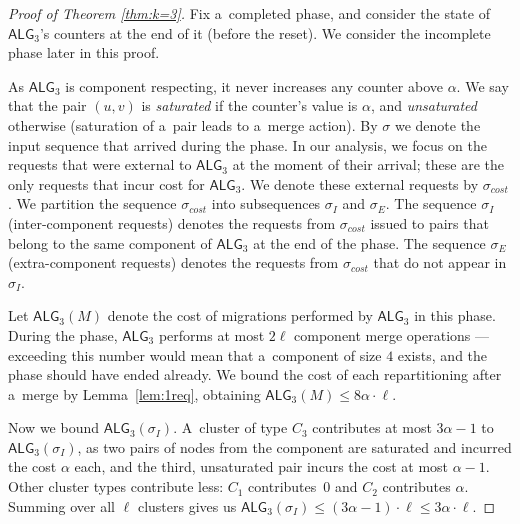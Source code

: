 \documentclass[a4paper,anonymous,USenglish]{lipics-v2019}
\newcommand{\TAlg}{{\ensuremath{\textsf{ALG}_{3}}}\xspace}
\begin{document}

\begin{proof}[Proof of Theorem \ref{thm:k=3}]
	Fix a~completed phase, and consider the state of \TAlg's counters at the end of it (before the reset).
	We consider the incomplete phase later in this proof.
	
	As \TAlg is component respecting, it never increases any counter above $\alpha$.
	We say that the pair $(u, v)$ is \emph{saturated} if the counter's value is $\alpha$, and \emph{unsaturated} otherwise (saturation of a~pair leads to a~merge action).
	By $\sigma$ we denote the input sequence that arrived during the phase.
	In our analysis, we focus on the requests that were external to \TAlg at the moment of their arrival; these are the only requests that incur cost for \TAlg.
	We denote these external requests by $\sigma_{cost}$.
	We partition the sequence $\sigma_{cost}$ into subsequences $\sigma_I$ and $\sigma_E$.
	The sequence $\sigma_I$ (inter-component requests) denotes the requests from $\sigma_{cost}$ issued to pairs that belong to the same component of \TAlg at the end of the phase.
	The sequence $\sigma_E$ (extra-component requests) denotes the requests from $\sigma_{cost}$ that do not appear in $\sigma_I$.
	
	
	Let $\TAlg(M)$ denote the cost of migrations performed by \TAlg in this phase.
	During the phase, \TAlg performs at most $2 \ell$ component merge operations ---
	exceeding this number would mean that a~component of size $4$ exists, and the phase should have ended already.
	We bound the cost of each repartitioning after a~merge by Lemma~\ref{lem:1req}, obtaining $\TAlg(M) \leq 8\alpha\cdot\ell$.
	
	Now we bound $\TAlg(\sigma_I)$.
	A~cluster of type $C_3$ contributes at most $3 \alpha - 1$ to $\TAlg(\sigma_I)$, as two pairs of nodes from the component are saturated and incurred the cost $\alpha$ each, and the third, unsaturated pair incurs the cost at most $\alpha-1$.
	Other cluster types contribute less: $C_1$ contributes~$0$ and $C_2$ contributes $\alpha$.
	Summing over all $\ell$ clusters gives us $\TAlg(\sigma_I) \leq (3 \alpha-1)\cdot \ell \leq 3\alpha\cdot\ell$.
	

\end{proof}
\end{document}
